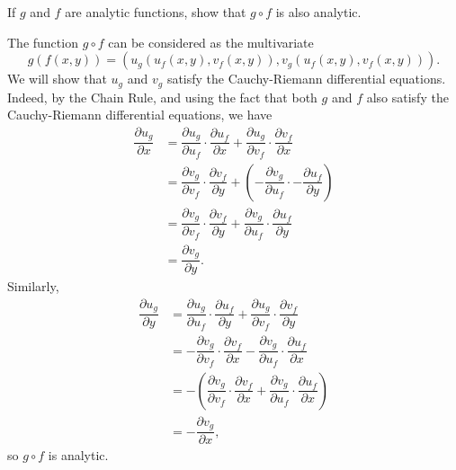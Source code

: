 \begin{exercise}
	If $g$ and $f$ are analytic functions, show that $g \circ f$ is also analytic.
	
	\begin{sol}
		The function $g \circ f$ can be considered as the multivariate $$g(f(x,y))=(u_g(u_f(x,y),v_f(x,y)),v_g(u_f(x,y),v_f(x,y))).$$ We will show that $u_g$ and $v_g$ satisfy the Cauchy-Riemann differential equations. Indeed, by the Chain Rule, and using the fact that both $g$ and $f$ also satisfy the Cauchy-Riemann differential equations, we have
		\begin{align*}
			\dfrac{\partial u_g}{\partial x} &=\dfrac{\partial u_g}{\partial u_f} \cdot \dfrac{\partial u_f}{\partial x}+\dfrac{\partial u_g}{\partial v_f} \cdot \dfrac{\partial v_f}{\partial x} \\
			&=\dfrac{\partial v_g}{\partial v_f} \cdot \dfrac{\partial v_f}{\partial y}+\left(-\dfrac{\partial v_g}{\partial u_f} \cdot -\dfrac{\partial u_f}{\partial y}\right) \\
			&=\dfrac{\partial v_g}{\partial v_f} \cdot \dfrac{\partial v_f}{\partial y}+\dfrac{\partial v_g}{\partial u_f} \cdot \dfrac{\partial u_f}{\partial y} \\
			&=\dfrac{\partial v_g}{\partial y}.
		\end{align*}
		Similarly,
		\begin{align*}
			\dfrac{\partial u_g}{\partial y} &=\dfrac{\partial u_g}{\partial u_f} \cdot \dfrac{\partial u_f}{\partial y}+\dfrac{\partial u_g}{\partial v_f} \cdot \dfrac{\partial v_f}{\partial y} \\
			&=-\dfrac{\partial v_g}{\partial v_f} \cdot \dfrac{\partial v_f}{\partial x}-\dfrac{\partial v_g}{\partial u_f} \cdot \dfrac{\partial u_f}{\partial x} \\
			&=-\left(\dfrac{\partial v_g}{\partial v_f} \cdot \dfrac{\partial v_f}{\partial x}+\dfrac{\partial v_g}{\partial u_f} \cdot \dfrac{\partial u_f}{\partial x}\right) \\
			&=-\dfrac{\partial v_g}{\partial x},
		\end{align*}
		so $g \circ f$ is analytic.
	\end{sol}
\end{exercise}

